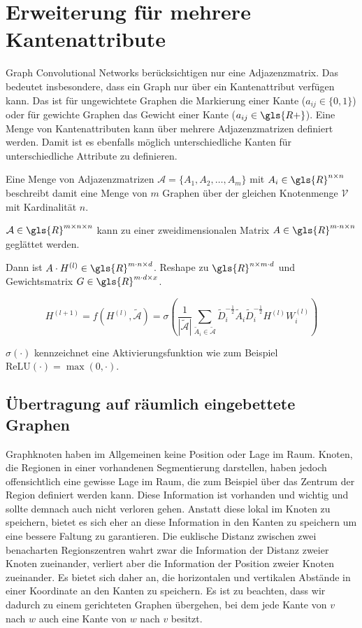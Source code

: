 \section{Erweiterung für mehrere Kantenattribute}

Graph Convolutional Networks berücksichtigen nur eine Adjazenzmatrix.
Das bedeutet insbesondere, dass ein Graph nur über ein Kantenattribut verfügen kann.
Das ist für ungewichtete Graphen die Markierung einer Kante ($a_{ij} \in \lbrace 0, 1 \rbrace$) oder für gewichte Graphen das Gewicht einer Kante ($a_{ij} \in \gls{R+}$).
Eine Menge von Kantenattributen kann über mehrere Adjazenzmatrizen definiert werden.
Damit ist es ebenfalls möglich unterschiedliche Kanten für unterschiedliche Attribute zu definieren.

Eine Menge von Adjazenzmatrizen $\mathcal{A} = \lbrace A_1, A_2, \ldots, A_m \rbrace$ mit $A_i \in \gls{R}^{n \times n}$ beschreibt damit eine Menge von $m$ Graphen über der gleichen Knotenmenge $\mathcal{V}$ mit Kardinalität $n$.

$\mathcal{A} \in \gls{R}^{m \times n \times n}$ kann zu einer zweidimensionalen Matrix $A \in \gls{R}^{m \cdot n \times n}$ geglättet werden.

Dann ist $A \cdot H^{(l)} \in \gls{R}^{m \cdot n \times d}$.
Reshape zu $\gls{R}^{n \times m \cdot d}$ und Gewichtsmatrix $G \in \gls{R}^{m \cdot d \times x}$.

\begin{equation}
  H^{(l+1)} = f(H^{(l)}, \mathcal{\tilde A}) = \sigma \left( \frac{1}{|\mathcal{\tilde A}|} \sum_{\tilde A_i \in \mathcal{\tilde A}} \tilde D_i^{-\frac{1}{2}} \tilde A_i \tilde D_i^{-\frac{1}{2}} H^{(l)} W^{(l)}_i \right)
\end{equation}

$\sigma(\cdot)$ kennzeichnet eine Aktivierungsfunktion wie zum Beispiel $\text{ReLU}(\cdot) = \max(0, \cdot)$.

\subsection{Übertragung auf räumlich eingebettete Graphen}

Graphknoten haben im Allgemeinen keine Position oder Lage im Raum.
Knoten, die Regionen in einer vorhandenen Segmentierung darstellen, haben jedoch offensichtlich eine gewisse Lage im Raum, die zum Beispiel über das Zentrum der Region definiert werden kann.
Diese Information ist vorhanden und wichtig und sollte demnach auch nicht verloren gehen.
Anstatt diese lokal im Knoten zu speichern, bietet es sich eher an diese Information in den Kanten zu speichern um eine bessere Faltung zu garantieren.
Die euklische Distanz zwischen zwei benacharten Regionszentren wahrt zwar die Information der Distanz zweier Knoten zueinander, verliert aber die Information der Position zweier Knoten zueinander.
Es bietet sich daher an, die horizontalen und vertikalen Abstände in einer Koordinate an den Kanten zu speichern.
Es ist zu beachten, dass wir dadurch zu einem gerichteten Graphen übergehen, bei dem jede Kante von $v$ nach $w$ auch eine Kante von $w$ nach $v$ besitzt.

